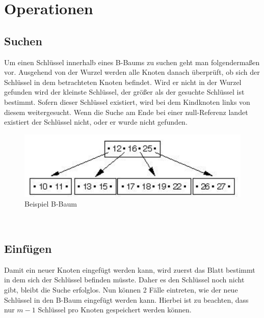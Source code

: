 \chapter{Operationen}

\section{Suchen}

Um einen Schl\"ussel innerhalb eines B-Baums zu suchen geht man folgenderma\ss en vor. Ausgehend von der Wurzel werden alle Knoten danach \"uberpr\"uft, ob sich der Schl\"ussel in dem betrachteten Knoten befindet. Wird er nicht in der Wurzel gefunden wird der kleinste Schl\"ussel, der gr\"o\ss er als der gesuchte Schl\"ussel ist bestimmt. Sofern dieser Schl\"ussel existiert, wird bei dem Kindknoten links von diesem weitergesucht. Wenn die Suche am Ende bei einer null-Referenz landet existiert der Schl\"ussel nicht, oder er wurde nicht gefunden. 
\\[0.5in]
\begin{figure}[h!] %
	\centering
	\includegraphics[width=0.7\linewidth]{images/Beispiel_Suche_B-Baum.pdf}
	\caption{Beispiel B-Baum}
	\label{Beispiel_Suche_B-Baum}
\end{figure}
\\[0.3in]
\section{Einf\"ugen}
Damit ein neuer Knoten eingef\"ugt werden kann, wird zuerst das Blatt bestimmt in dem sich der Schl\"ussel befinden m\"usste. Daher es den Schl\"ussel noch nicht gibt, bleibt die Suche erfolglos. Nun k\"onnen 2 F\"alle eintreten, wie der neue Schl\"ussel in den B-Baum eingef\"ugt werden kann. Hierbei ist zu beachten, dass nur $m-1$ Schl\"ussel pro Knoten gespeichert werden k\"onnen. 
